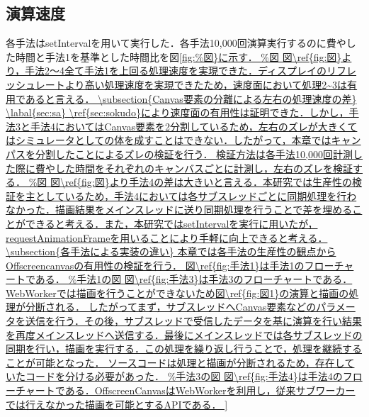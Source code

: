 \documentclass[a4j,12pt]{jsarticle}
\begin{document}
\subsection{演算速度}
\label{sec:sokudo}
各手法はsetIntervalを用いて実行した．各手法10,000回演算実行するのに費やした時間と手法1を基準とした時間比を図\ref{fig:%
図\ref{fig:図}より，手法2～4全て手法1を上回る処理速度を実現できた．ディスプレイのリフレッシュレートより高い処理速度を実現できたため，速度面において処理2~3は有用であると言える．

\subsection{Canvas要素の分離による左右の処理速度の差}
\labal{sec:sa}
\ref{sec:sokudo}により速度面の有用性は証明できた．しかし，手法3と手法4においてはCanvas要素を2分割しているため，左右のズレが大きくてはシミュレータとしての体を成すことはできない．したがって，本章ではキャンパスを分割したことによるズレの検証を行う．
検証方法は各手法10,000回計測した際に費やした時間をそれぞれのキャンバスごとに計測し，左右のズレを検証する．
図\ref{fig:図}より手法4の差は大きいと言える．本研究では生産性の検証を主としているため，手法4においては各サブスレッドごとに同期処理を行わなかった．描画結果をメインスレッドに送り同期処理を行うことで差を埋めることができると考える．また，本研究ではsetIntervalを実行に用いたが，requestAnimationFrameを用いることにより手軽に向上できると考える．

\subsection{各手法による実装の違い}
本章では各手法の生産性の観点からOffscreencanvasの有用性の検証を行う．

図\ref{fig:手法1}は手法1のフローチャートである．

図\ref{fig:手法3}は手法3のフローチャートである．WebWorkerでは描画を行うことができないため図\ref{fig:図1}の演算と描画の処理が分断される．

したがってまず，サブスレッドへCanvas要素などのパラメータを送信を行う．その後，サブスレッドで受信したデータを基に演算を行い結果を再度メインスレッドへ送信する．最後にメインスレッドでは各サブスレッドの同期を行い，描画を実行する．この処理を繰り返し行うことで，処理を継続することが可能となった．
ソースコードは処理と描画が分断されるため，存在していたコードを分ける必要があった．

図\ref{fig:手法4}は手法4のフローチャートである．OffscreenCanvasはWebWorkerを利用し，従来サブワーカーでは行えなかった描画を可能とするAPIである．

}
\end{document}
